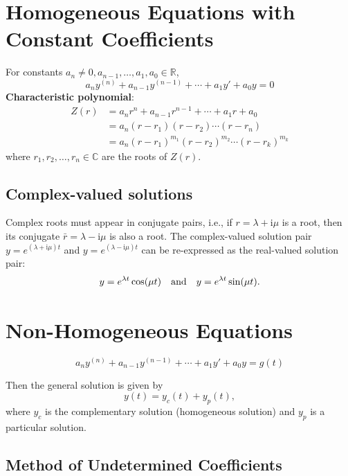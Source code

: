 \documentclass[10pt,UTF8]{article}
\theoremstyle{definition}
\newtheorem{definition inner}{Definition}[section]
\theoremstyle{definition}
\newtheorem{theorem inner}{Theorem}[section]
\theoremstyle{definition}
\newtheorem*{proof inner}{\textit{Proof}}
\theoremstyle{plain}
\newtheorem{tip inner}{Tip}[section]
\theoremstyle{remark}
\newcommand{\iu}{\mathrm{i}}  %
\begin{document}
\section{Homogeneous Equations with Constant Coefficients}

For constants \(a_n \ne 0, a_{n-1}, \ldots, a_1, a_0 \in \mathbb{R}\),
\begin{equation*}
  a_n y^{(n)} + a_{n-1} y^{(n-1)} + \cdots + a_1 y' + a_0 y = 0
\end{equation*}
\textbf{Characteristic polynomial}:
\begin{align*}
  Z(r) &= a_n r^n + a_{n-1} r^{n-1} + \cdots + a_1 r + a_0 \\
  &= a_n (r - r_1)(r - r_2) \cdots (r - r_n) \\
  &= a_n {(r - r_1)}^{m_1} {(r - r_2)}^{m_2} \cdots {(r - r_k)}^{m_k}
\end{align*}
where \(r_1, r_2, \ldots, r_n \in \mathbb{C}\) are the roots of \(Z(r)\).

\subsection*{Complex-valued solutions}

Complex roots must appear in conjugate pairs, i.e., if
\(r = \lambda + \iu \mu \) is a root,
then its conjugate \(\bar{r} = \lambda - \iu \mu \) is also a root.
The complex-valued solution pair \(y = e^{(\lambda + \iu \mu) t}\)
and \(y = e^{(\lambda - \iu \mu) t}\) can be re-expressed
as the real-valued solution pair:
\begin{equation*}
  y = e^{\lambda t} \cos(\mu t) \qand
  y = e^{\lambda t} \sin(\mu t).
\end{equation*}

\section{Non-Homogeneous Equations}

\begin{equation*}
  a_n y^{(n)} + a_{n-1} y^{(n-1)} + \cdots + a_1 y' + a_0 y = g(t)
\end{equation*}

Then the general solution is given by
\begin{equation*}
  y(t) = y_c(t) + y_p(t),
\end{equation*}
where \(y_c\) is the complementary solution (homogeneous solution)
and \(y_p\) is a particular solution.

\subsection{Method of Undetermined Coefficients}
\end{document}
